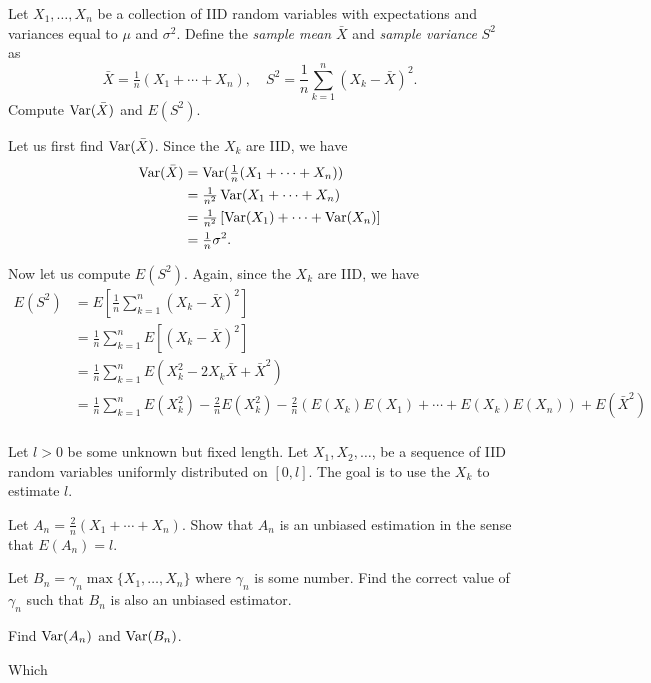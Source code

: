 \begin{problem}
  Let \(X_1,\dotsc,X_n\) be a collection of IID random variables with
  expectations and variances equal to \(\mu\) and \(\sigma^2\). Define the
  \emph{sample mean} \(\bar X\) and \emph{sample variance} \(S^2\) as
  \[
    \bar X=\tfrac{1}{n}(X_1+\dotsb+X_n),\quad
    S^2=\frac{1}{n}\sum_{k=1}^n(X_k-\bar X)^2.
  \]
  Compute \(\operatorname{Var}(\bar X)\) and \(E(S^2)\).
\end{problem}
\begin{solution*}
  Let us first find \(\operatorname{Var}(\bar X)\). Since the \(X_k\) are IID, we have
  \begin{align*}
    \operatorname{Var}(\bar X)
    &=\operatorname{Var}(\tfrac{1}{n}(X_1+\dotsb+X_n))\\
    &=\tfrac{1}{n^2}\operatorname{Var}(X_1+\dotsb+X_n)\\
    &=\tfrac{1}{n^2}\left[\operatorname{Var}(X_1)+\dotsb+\operatorname{Var}(X_n)\right]\\
    &=\tfrac{1}{n}\sigma^2.
  \end{align*}

  Now let us compute \(E(S^2)\). Again, since the \(X_k\) are IID, we have
  \begin{align*}
    E(S^2)
    &=E\left[\frac{1}{n}\sum\nolimits_{k=1}^n (X_k-\bar X)^2\right]\\
    &=\frac{1}{n}\sum_{k=1}^nE\left[(X_k-\bar X)^2\right]\\
    &=\frac{1}{n}\sum_{k=1}^nE(X_k^2-2 X_k\bar X+\bar X^2)\\
    &=\frac{1}{n}\sum_{k=1}^nE(X_k^2)-\tfrac{2}{n}E(X_k^2)
      -\tfrac{2}{n}(E(X_k)E(X_1)+\dotsb+E(X_k)E(X_n))+E(\bar X^2)\\
  \end{align*}
\end{solution*}

\begin{problem}
  Let \(l>0\) be some unknown but fixed length. Let \(X_1,X_2,\dotsc\), be
  a sequence of IID random variables uniformly distributed on
  \([0,l]\). The goal is to use the \(X_k\) to estimate \(l\).
  \begin{alphlist}
  \item Let \(A_n=\tfrac{2}{n}(X_1+\dotsb+X_n).\) Show that \(A_n\) is an
    unbiased estimation in the sense that \(E(A_n)=l\).
  \item Let \(B_n=\gamma_n\max\{X_1,\dotsc,X_n\}\) where \(\gamma_n\) is
    some number. Find the correct value of \(\gamma_n\) such that \(B_n\)
    is also an unbiased estimator.
  \item Find \(\operatorname{Var}(A_n)\) and \(\operatorname{Var}(B_n)\).
  \item Which
  \end{alphlist}
\end{problem}
\begin{solution*}
\end{solution*}

